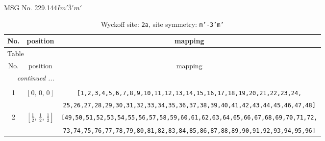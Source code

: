 \documentclass[fleqn,8pt]{jsarticle}
\begin{document}
\setcounter{MaxMatrixCols}{32}

\renewcommand{\tablename}{Table~}
\renewcommand{\figurename}{Figure~}
\begin{center}
\LARGE
MSG No. 229.144\quad$Im'\bar{3}'m'$
\end{center}
\renewcommand{\arraystretch}{1.2}
\begin{longtable}{ccc}
\caption{Wyckoff site: {\tt 2a}, site symmetry: {\tt m'-3'm'}}
 \\
 \hline \hline
No. & position & mapping \\ \hline \endfirsthead

\multicolumn{2}{l}{\tablename\ \thetable{}} \\
 \hline \hline
No. & position & mapping \\ \hline \endhead

 \hline \hline
\multicolumn{2}{r}{\footnotesize\it continued ...} \\ \endfoot

 \hline \hline
\multicolumn{2}{r}{} \\ \endlastfoot

1 & $\left[ 0,\, 0,\, 0 \right]$ & {\tt [1,2,3,4,5,6,7,8,9,10,11,12,13,14,15,16,17,18,19,20,21,22,23,24,} \\ \hline
 &  & {\tt 25,26,27,28,29,30,31,32,33,34,35,36,37,38,39,40,41,42,43,44,45,46,47,48]} \\ \hline
2 & $\left[ \frac{1}{2},\, \frac{1}{2},\, \frac{1}{2} \right]$ & {\tt [49,50,51,52,53,54,55,56,57,58,59,60,61,62,63,64,65,66,67,68,69,70,71,72,} \\ \hline
 &  & {\tt 73,74,75,76,77,78,79,80,81,82,83,84,85,86,87,88,89,90,91,92,93,94,95,96]} \\
\end{longtable}
\renewcommand{\arraystretch}{1.2}
\end{document}
